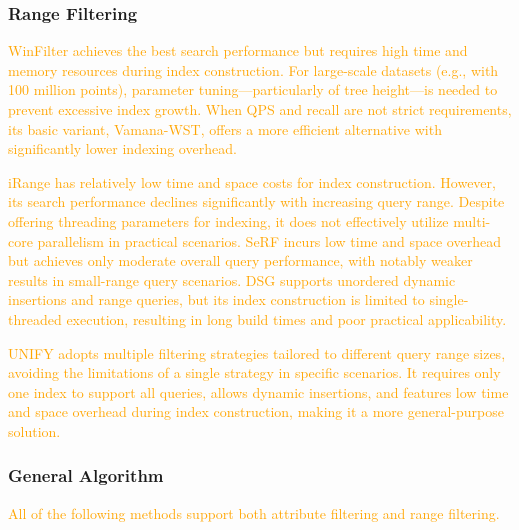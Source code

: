 \documentclass[sigconf, nonacm]{acmart}
\begin{document}
{	\subsubsection{Range Filtering}
\textcolor{orange}{
	WinFilter achieves the best search performance but requires high time and memory resources during index construction. For large-scale datasets (e.g., with 100 million points), parameter tuning—particularly of tree height—is needed to prevent excessive index growth. When QPS and recall are not strict requirements, its basic variant, Vamana-WST, offers a more efficient alternative with significantly lower indexing overhead.
		}
	
	\textcolor{orange}{
	iRange has relatively low time and space costs for index construction. However, its search performance declines significantly with increasing query range. Despite offering threading parameters for indexing, it does not effectively utilize multi-core parallelism in practical scenarios.
	SeRF incurs low time and space overhead but achieves only moderate overall query performance, with notably weaker results in small-range query scenarios.
	DSG supports unordered dynamic insertions and range queries, but its index construction is limited to single-threaded execution, resulting in long build times and poor practical applicability.}
	
		\textcolor{orange}{
	UNIFY adopts multiple filtering strategies tailored to different query range sizes, avoiding the limitations of a single strategy in specific scenarios. It requires only one index to support all queries, allows dynamic insertions, and features low time and space overhead during index construction, making it a more general-purpose solution.}

	\subsubsection{General Algorithm}
\textcolor{orange}{All of the following methods support both attribute filtering and range filtering.}

}
\end{document}
